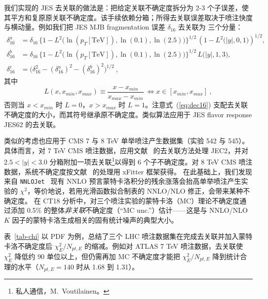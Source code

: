 我们实现的 JES 去关联的做法是：把给定关联不确定度拆分为 2-3 个子误差，使其平方和复原原关联不确定度。该手续依赖分箱；所得去关联误差取决于喷注快度与横动量。例如我们把 JES MJB fragmentation 误差 $\delta_{16}$ 去关联为
三个分量：
\begin{align}
	\delta^a_{16} &= \delta_{16}\, \Big\{ 1 - L^2\big( \ln(p_T[\mathrm{TeV}]),\ln(0.1),\ln(2.5) \big) \Big\}^{1/2}\, \left( 1 - L^2\big(|y|,0,1\big) \right)^{1/2}, \nonumber \\
	\delta^b_{16} &= \delta_{16}\, \Big\{ 1 - L^2\big( \ln(p_T[\mathrm{TeV}]),\ln(0.1),\ln(2.5) \big) \Big\}^{1/2}\, L\big(|y|,1,3\big), \nonumber \\
	\delta^c_{16} &= \big( \delta^2_{16} - (\delta^a_{16})^2 - (\delta^b_{16})^2 \big)^{1/2}\ ,
\label{eq:dec16}
\end{align}
其中
\begin{equation}
L(x,x_\mathit{min},x_\mathit{max}) \equiv \frac{x - x_\mathit{min}}{x_\mathit{max} - x_\mathit{min}}\ \iff x \in [x_\mathit{min},x_\mathit{max}]\ ,
\end{equation}
否则当 $x < x_\mathit{min}$ 时 $L = 0$，$x > x_\mathit{max}$ 时 $L = 1$。注意式~(\ref{eq:dec16}) 支配去关联不确定度的大小，而其符号继承原不确定度。类似算法应用于 JES flavor response JES62 的去关联。

类似的考虑也应用于 CMS 7 与 8 TeV 单举喷注产生数据集（实验 542 与 545）。具体而言，对 7 TeV CMS 喷注数据，应用文献~\cite{Khachatryan:2014waa} 的去关联方法处理 JEC2，并对 $2.5 < |y| < 3.0$ 分箱附加一项去关联\footnote{私人通信，M.~Voutilainen。}以得到 6 个子不确定度。对 8 TeV CMS 喷注数据，系统不确定度按文献~\cite{Khachatryan:2016kdb} 的处理用 xFitter 框架获得。
在此基础上，我们发现来自 \texttt{NNLOJet}~\cite{Ridder:2015dxa,Gehrmann-DeRidder:2017mvr,Currie:2016bfm,Currie:2017ctp} 现有 NNLO 预言蒙特卡洛积分的残余涨落会抬高单举喷注产生实验的 $\chi^2$，等价地说，若用光滑函数拟合制表的 NNLO/NLO 修正，会带来某种不确定度。
在 CT18 分析中，对三个喷注实验的蒙特卡洛（MC）理论不确定度通过添加 0.5\% 的整体{\it 非关联}不确定度（``MC unc.''）估计——这是与 NNLO/NLO $K$ 因子的蒙特卡洛生成相关的固有统计噪声的典型大小。

表~\ref{tab-chi} 以 \CTHERAII{} PDF 为例，总结了三个 LHC 喷注数据集在完成去关联并加入蒙特卡洛不确定度后 $\chi^2_E/N_{pt,E}$ 的缩减。例如对 ATLAS 7 TeV 喷注数据，去关联使 $\chi^2_E$ 降低约 90 单位以上，但仍需再加 MC 不确定度才能把 $\chi^2_E/N_{pt,E}$ 降到统计合理的水平（$N_{pt,E}=140$ 时从 1.68 到 1.31）。

